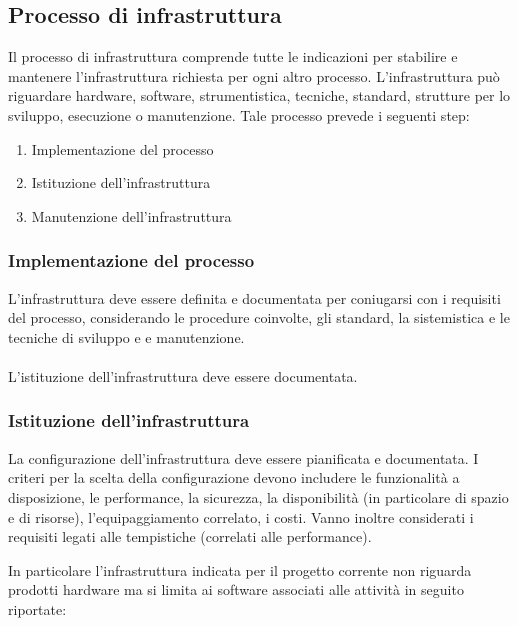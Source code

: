 \subsection{Processo di infrastruttura}
Il processo di infrastruttura comprende tutte le indicazioni per stabilire e mantenere l'infrastruttura richiesta per ogni altro processo. L'infrastruttura può riguardare hardware, software, strumentistica, tecniche, standard, strutture per lo sviluppo, esecuzione o manutenzione.
Tale processo prevede i seguenti step:

\begin{enumerate}
    \item Implementazione del processo
    \item Istituzione dell'infrastruttura
    \item Manutenzione dell'infrastruttura
\end{enumerate}

\subsubsection{Implementazione del processo}

\myparagraph{}L'infrastruttura deve essere definita e documentata per coniugarsi con i requisiti del processo, considerando le procedure coinvolte, gli standard, la sistemistica e le tecniche di sviluppo e e manutenzione.

\paragraph{} L'istituzione dell'infrastruttura deve essere documentata.

\subsubsection{Istituzione dell'infrastruttura}

\myparagraph{}
La configurazione dell'infrastruttura deve essere pianificata e documentata. I criteri per la scelta della configurazione devono includere le funzionalità a disposizione, le performance, la sicurezza, la disponibilità (in particolare di spazio e di risorse), l'equipaggiamento correlato, i costi. Vanno inoltre considerati i requisiti legati alle tempistiche (correlati alle performance).

In particolare l'infrastruttura indicata per il progetto corrente non riguarda prodotti hardware ma si limita ai software associati alle attività in seguito riportate:

